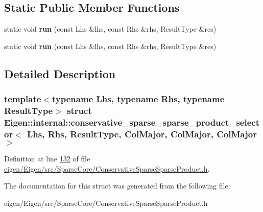 \subsection*{Static Public Member Functions}
\begin{DoxyCompactItemize}
\item 
\mbox{\label{struct_eigen_1_1internal_1_1conservative__sparse__sparse__product__selector_3_01_lhs_00_01_rhs_0f4a0316e9e8c40b475b674926b5b8b8d_a317a92ae45ac58dc58de38589845a606}} 
static void {\bfseries run} (const Lhs \&lhs, const Rhs \&rhs, Result\+Type \&res)
\item 
\mbox{\label{struct_eigen_1_1internal_1_1conservative__sparse__sparse__product__selector_3_01_lhs_00_01_rhs_0f4a0316e9e8c40b475b674926b5b8b8d_a317a92ae45ac58dc58de38589845a606}} 
static void {\bfseries run} (const Lhs \&lhs, const Rhs \&rhs, Result\+Type \&res)
\end{DoxyCompactItemize}


\subsection{Detailed Description}
\subsubsection*{template$<$typename Lhs, typename Rhs, typename Result\+Type$>$\newline
struct Eigen\+::internal\+::conservative\+\_\+sparse\+\_\+sparse\+\_\+product\+\_\+selector$<$ Lhs, Rhs, Result\+Type, Col\+Major, Col\+Major, Col\+Major $>$}



Definition at line \hyperlink{eigen_2_eigen_2src_2_sparse_core_2_conservative_sparse_sparse_product_8h_source_l00132}{132} of file \hyperlink{eigen_2_eigen_2src_2_sparse_core_2_conservative_sparse_sparse_product_8h_source}{eigen/\+Eigen/src/\+Sparse\+Core/\+Conservative\+Sparse\+Sparse\+Product.\+h}.



The documentation for this struct was generated from the following file\+:\begin{DoxyCompactItemize}
\item 
eigen/\+Eigen/src/\+Sparse\+Core/\+Conservative\+Sparse\+Sparse\+Product.\+h\end{DoxyCompactItemize}
